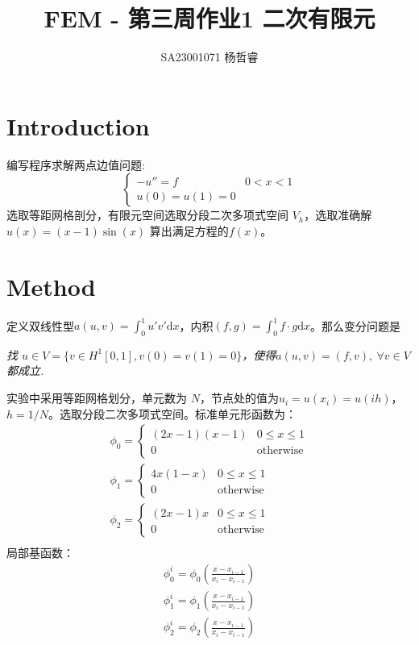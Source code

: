 \documentclass{ctexart}
\title{FEM - 第三周作业1 二次有限元}
\author{SA23001071 杨哲睿}
\begin{document}
\maketitle

\section{Introduction}
编写程序求解两点边值问题:
\begin{equation}
  \begin{cases}
    - u'' = f & 0 < x < 1\\
    u(0) = u(1) = 0
  \end{cases}
\end{equation}
选取等距网格剖分，有限元空间选取分段二次多项式空间 $V_h$，选取准确解 $u(x) = (x-1) \sin (x)$ 算出满足方程的$f(x)$。

\section{Method}


定义双线性型$a(u, v) = \int_0^1 u' v' \mathrm dx$，内积$(f, g) = \int_0 ^ 1 f \cdot g \mathrm dx$。那么变分问题是

\textit{找 $u\in V = \{ v\in H^1[0, 1], v(0) = v(1) = 0\}$，使得$a(u, v) = (f, v), ~ \forall v \in V$都成立.}

实验中采用等距网格划分，单元数为 $N$，节点处的值为$u_i = u(x_i) = u(i h)$，$h = 1/N$。选取分段二次多项式空间。标准单元形函数为：
\begin{eqnarray}
  \phi_0 = \begin{cases}
    (2 x - 1) (x-1) & 0 \le x \le 1\\
    0&\text{otherwise}
  \end{cases}\\
  \phi_1 = \begin{cases}
    4 x (1-x) & 0 \le x \le 1\\
    0&\text{otherwise}
  \end{cases}\\
  \phi_2 = \begin{cases}
    (2 x - 1) x & 0 \le x \le 1\\
    0&\text{otherwise}
  \end{cases}\\
\end{eqnarray}
局部基函数：
\begin{eqnarray}
  \phi_0^i = \phi_0(\frac{x-x_{i-1}}{x_i-x_{i-1}})\\
  \phi_1^i = \phi_1(\frac{x-x_{i-1}}{x_i-x_{i-1}})\\
  \phi_2^i = \phi_2(\frac{x-x_{i-1}}{x_i-x_{i-1}})\\
\end{eqnarray}
\end{document}
